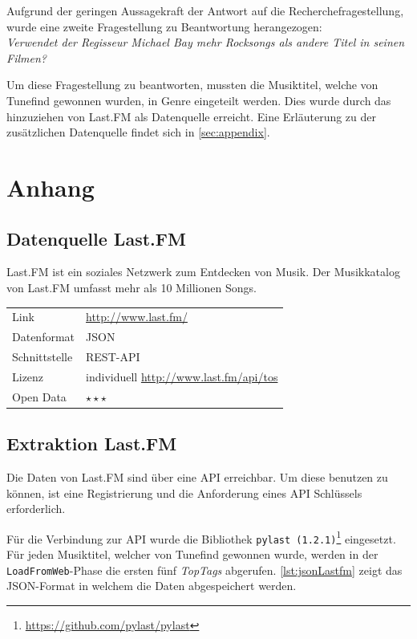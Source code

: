 \documentclass[parskip]{scrartcl}
\begin{document}
Aufgrund der geringen Aussagekraft der Antwort auf die Recherchefragestellung, wurde eine zweite Fragestellung zu Beantwortung herangezogen:\\
\textit{Verwendet der Regisseur Michael Bay mehr Rocksongs als andere Titel in seinen Filmen?}

Um diese Fragestellung zu beantworten, mussten die Musiktitel, welche von Tunefind gewonnen wurden, in Genre eingeteilt werden. Dies wurde durch das hinzuziehen von Last.FM als Datenquelle erreicht. Eine Erläuterung zu der zusätzlichen Datenquelle findet sich in \autoref{sec:appendix}.

\pagebreak
\section{Anhang}
\label{sec:appendix}

\subsection{Datenquelle Last.FM}

Last.FM ist ein soziales Netzwerk zum Entdecken von Musik. Der Musikkatalog von Last.FM umfasst mehr als 10 Millionen Songs.

\begin{tabular}{l|p{9cm}}
    Link & \url{http://www.last.fm/} \\
    Datenformat & JSON \\
    Schnittstelle & REST-API \\
    Lizenz & individuell \href{http://www.last.fm/api/tos}{http://www.last.fm/api/tos} \\
    Open Data & $\star\star\star$ \\
\end{tabular}

\subsection{Extraktion Last.FM}

Die Daten von Last.FM sind über eine API erreichbar. Um diese benutzen zu können, ist eine Registrierung und die Anforderung eines API Schlüssels erforderlich.

Für die Verbindung zur API wurde die Bibliothek \texttt{pylast (1.2.1)}\footnote{\href{https://github.com/pylast/pylast}{https://github.com/pylast/pylast}} eingesetzt. Für jeden Musiktitel, welcher von Tunefind gewonnen wurde, werden in der \texttt{LoadFromWeb}-Phase die ersten fünf \textit{TopTags} abgerufen. \autoref{lst:jsonLastfm} zeigt das JSON-Format in welchem die Daten abgespeichert werden.
\end{document}
